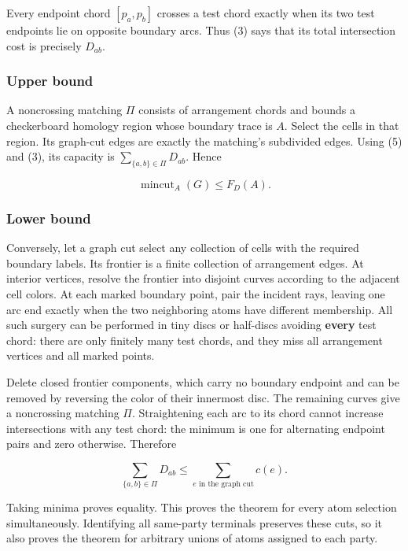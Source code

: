 \documentclass[11pt]{article}
\begin{document}
Every endpoint chord \([p_a,p_b]\) crosses a test chord exactly when its
two test endpoints lie on opposite boundary arcs. Thus (3) says that its
total intersection cost is precisely \(D_{ab}\).

\subsubsection{Upper bound}\label{upper-bound}

A noncrossing matching \(\Pi\) consists of arrangement chords and bounds
a checkerboard homology region whose boundary trace is \(A\). Select the
cells in that region. Its graph-cut edges are exactly the matching's
subdivided edges. Using (5) and (3), its capacity is
\(\sum_{\{a,b\}\in\Pi}D_{ab}\). Hence

\[
\operatorname{mincut}_A(G)\leq F_D(A).
\]

\subsubsection{Lower bound}\label{lower-bound}

Conversely, let a graph cut select any collection of cells with the
required boundary labels. Its frontier is a finite collection of
arrangement edges. At interior vertices, resolve the frontier into
disjoint curves according to the adjacent cell colors. At each marked
boundary point, pair the incident rays, leaving one arc end exactly when
the two neighboring atoms have different membership. All such surgery
can be performed in tiny discs or half-discs avoiding \textbf{every}
test chord: there are only finitely many test chords, and they miss all
arrangement vertices and all marked points.

Delete closed frontier components, which carry no boundary endpoint and
can be removed by reversing the color of their innermost disc. The
remaining curves give a noncrossing matching \(\Pi\). Straightening each
arc to its chord cannot increase intersections with any test chord: the
minimum is one for alternating endpoint pairs and zero otherwise.
Therefore

\[
\sum_{\{a,b\}\in\Pi}D_{ab}
\leq\sum_{e\text{ in the graph cut}}c(e).
\]

Taking minima proves equality. This proves the theorem for every atom
selection simultaneously. Identifying all same-party terminals preserves
these cuts, so it also proves the theorem for arbitrary unions of atoms
assigned to each party.
\end{document}
